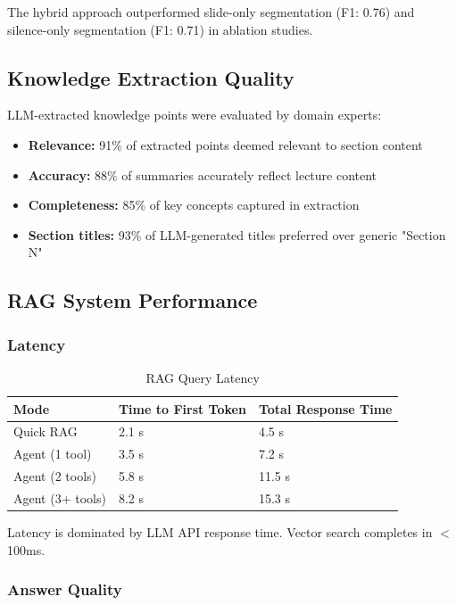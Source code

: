 \documentclass[12pt,a4paper]{article}
\begin{document}
The hybrid approach outperformed slide-only segmentation (F1: 0.76) and silence-only segmentation (F1: 0.71) in ablation studies.

\subsection{Knowledge Extraction Quality}

LLM-extracted knowledge points were evaluated by domain experts:

\begin{itemize}
    \item \textbf{Relevance:} 91\% of extracted points deemed relevant to section content
    \item \textbf{Accuracy:} 88\% of summaries accurately reflect lecture content
    \item \textbf{Completeness:} 85\% of key concepts captured in extraction
    \item \textbf{Section titles:} 93\% of LLM-generated titles preferred over generic "Section N"
\end{itemize}

\subsection{RAG System Performance}

\subsubsection{Latency}

\begin{table}[H]
    \centering
    \caption{RAG Query Latency}
    \begin{tabular}{@{}lll@{}}
        \toprule
        \textbf{Mode} & \textbf{Time to First Token} & \textbf{Total Response Time} \\ \midrule
        Quick RAG & 2.1 s & 4.5 s \\
        Agent (1 tool) & 3.5 s & 7.2 s \\
        Agent (2 tools) & 5.8 s & 11.5 s \\
        Agent (3+ tools) & 8.2 s & 15.3 s \\ \bottomrule
    \end{tabular}
\end{table}

Latency is dominated by LLM API response time. Vector search completes in $<$100ms.

\subsubsection{Answer Quality}
\end{document}
